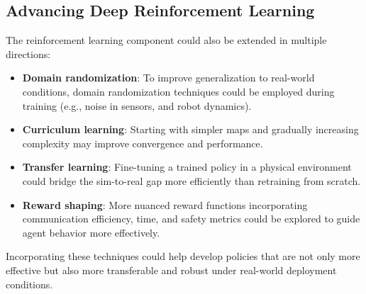 \subsection{Advancing Deep Reinforcement Learning}
The reinforcement learning component could also be extended in multiple directions:
\begin{itemize}
  \item \textbf{Domain randomization}: To improve generalization to real-world conditions, domain randomization techniques could be employed during training (e.g., noise in sensors, and robot dynamics).
  \item \textbf{Curriculum learning}: Starting with simpler maps and gradually increasing complexity may improve convergence and performance.
  \item \textbf{Transfer learning}: Fine-tuning a trained policy in a physical environment could bridge the sim-to-real gap more efficiently than retraining from scratch.
  \item \textbf{Reward shaping}: More nuanced reward functions incorporating communication efficiency, time, and safety metrics could be explored to guide agent behavior more effectively.
\end{itemize}

Incorporating these techniques could help develop policies that are not only more effective but also more transferable and robust under real-world deployment conditions.
